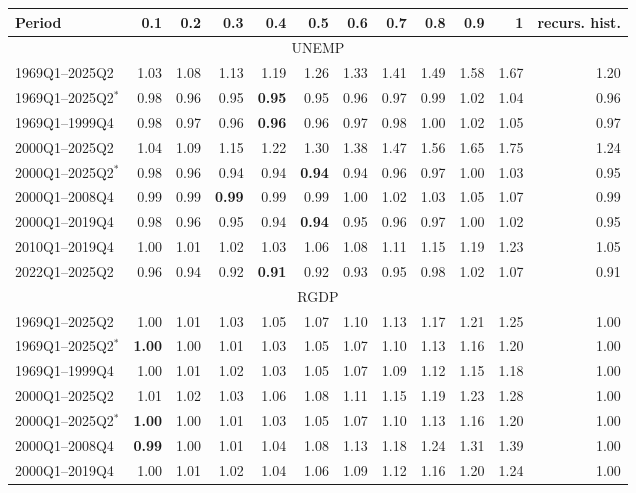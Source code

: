 \begin{tabular}{lrrrrrrrrrrr}
\hline
Period & 0.1 & 0.2 & 0.3 & 0.4 & 0.5 & 0.6 & 0.7 & 0.8 & 0.9 & 1 & recurs. hist. \\
\hline
\multicolumn{12}{c}{UNEMP} \\
1969Q1--2025Q2 & 1.03 & 1.08 & 1.13 & 1.19 & 1.26 & 1.33 & 1.41 & 1.49 & 1.58 & 1.67 & 1.20 \\
1969Q1--2025Q2$^*$ & 0.98 & 0.96 & 0.95 & \textbf{0.95} & 0.95 & 0.96 & 0.97 & 0.99 & 1.02 & 1.04 & 0.96 \\
1969Q1--1999Q4 & 0.98 & 0.97 & 0.96 & \textbf{0.96} & 0.96 & 0.97 & 0.98 & 1.00 & 1.02 & 1.05 & 0.97 \\
2000Q1--2025Q2 & 1.04 & 1.09 & 1.15 & 1.22 & 1.30 & 1.38 & 1.47 & 1.56 & 1.65 & 1.75 & 1.24 \\
2000Q1--2025Q2$^*$ & 0.98 & 0.96 & 0.94 & 0.94 & \textbf{0.94} & 0.94 & 0.96 & 0.97 & 1.00 & 1.03 & 0.95 \\
2000Q1--2008Q4 & 0.99 & 0.99 & \textbf{0.99} & 0.99 & 0.99 & 1.00 & 1.02 & 1.03 & 1.05 & 1.07 & 0.99 \\
2000Q1--2019Q4 & 0.98 & 0.96 & 0.95 & 0.94 & \textbf{0.94} & 0.95 & 0.96 & 0.97 & 1.00 & 1.02 & 0.95 \\
2010Q1--2019Q4 & 1.00 & 1.01 & 1.02 & 1.03 & 1.06 & 1.08 & 1.11 & 1.15 & 1.19 & 1.23 & 1.05 \\
2022Q1--2025Q2 & 0.96 & 0.94 & 0.92 & \textbf{0.91} & 0.92 & 0.93 & 0.95 & 0.98 & 1.02 & 1.07 & 0.91 \\
\hline
\multicolumn{12}{c}{RGDP} \\
1969Q1--2025Q2 & 1.00 & 1.01 & 1.03 & 1.05 & 1.07 & 1.10 & 1.13 & 1.17 & 1.21 & 1.25 & 1.00 \\
1969Q1--2025Q2$^*$ & \textbf{1.00} & 1.00 & 1.01 & 1.03 & 1.05 & 1.07 & 1.10 & 1.13 & 1.16 & 1.20 & 1.00 \\
1969Q1--1999Q4 & 1.00 & 1.01 & 1.02 & 1.03 & 1.05 & 1.07 & 1.09 & 1.12 & 1.15 & 1.18 & 1.00 \\
2000Q1--2025Q2 & 1.01 & 1.02 & 1.03 & 1.06 & 1.08 & 1.11 & 1.15 & 1.19 & 1.23 & 1.28 & 1.00 \\
2000Q1--2025Q2$^*$ & \textbf{1.00} & 1.00 & 1.01 & 1.03 & 1.05 & 1.07 & 1.10 & 1.13 & 1.16 & 1.20 & 1.00 \\
2000Q1--2008Q4 & \textbf{0.99} & 1.00 & 1.01 & 1.04 & 1.08 & 1.13 & 1.18 & 1.24 & 1.31 & 1.39 & 1.00 \\
2000Q1--2019Q4 & 1.00 & 1.01 & 1.02 & 1.04 & 1.06 & 1.09 & 1.12 & 1.16 & 1.20 & 1.24 & 1.00 \\

\end{tabular}
